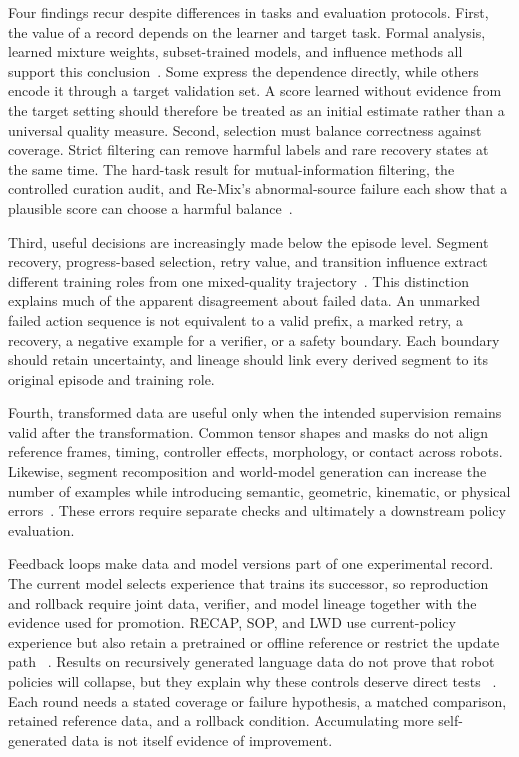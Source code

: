 Four findings recur despite differences in tasks and evaluation protocols.
First, the value of a record depends on the learner and target task.
Formal analysis, learned mixture weights, subset-trained models, and influence methods all support this conclusion~\cite{belkhale2023data_2306_02437,hejna2024re_2408_14037,dass2025datamil_2505_09603,lee2026quality_2603_09056}.
Some express the dependence directly, while others encode it through a target validation set.
A score learned without evidence from the target setting should therefore be treated as an initial estimate rather than a universal quality measure.
Second, selection must balance correctness against coverage.
Strict filtering can remove harmful labels and rare recovery states at the same time.
The hard-task result for mutual-information filtering, the controlled curation audit, and Re-Mix's abnormal-source failure each show that a plausible score can choose a harmful balance~\cite{hejna2025robot_2502_08623,bedi2026what_2606_10229,hejna2024re_2408_14037}.

Third, useful decisions are increasingly made below the episode level.
Segment recovery, progress-based selection, retry value, and transition influence extract different training roles from one mixed-quality trajectory~\cite{wu2024learning_2401_08957,zhang2025scizor_2505_22626,wu2026sieve_2607_06442,qin2026beyond_2606_24633,lee2026quality_2603_09056}.
This distinction explains much of the apparent disagreement about failed data.
An unmarked failed action sequence is not equivalent to a valid prefix, a marked retry, a recovery, a negative example for a verifier, or a safety boundary.
Each boundary should retain uncertainty, and lineage should link every derived segment to its original episode and training role.

Fourth, transformed data are useful only when the intended supervision remains valid after the transformation.
Common tensor shapes and masks do not align reference frames, timing, controller effects, morphology, or contact across robots.
Likewise, segment recomposition and world-model generation can increase the number of examples while introducing semantic, geometric, kinematic, or physical errors~\cite{mandlekar2023mimicgen_2310_17596,li2026xiaomi_2607_11643}.
These errors require separate checks and ultimately a downstream policy evaluation.

Feedback loops make data and model versions part of one experimental record.
The current model selects experience that trains its successor, so reproduction and rollback require joint data, verifier, and model lineage together with the evidence used for promotion.
RECAP, SOP, and LWD use current-policy experience but also retain a pretrained or offline reference or restrict the update path ~\cite{intelligence20250_2511_14759,pan2026sop_2601_03044,wang2026learning_2605_00416}.
Results on recursively generated language data do not prove that robot policies will collapse, but they explain why these controls deserve direct tests ~\cite{shumailov2024collapse}.
Each round needs a stated coverage or failure hypothesis, a matched comparison, retained reference data, and a rollback condition.
Accumulating more self-generated data is not itself evidence of improvement.

